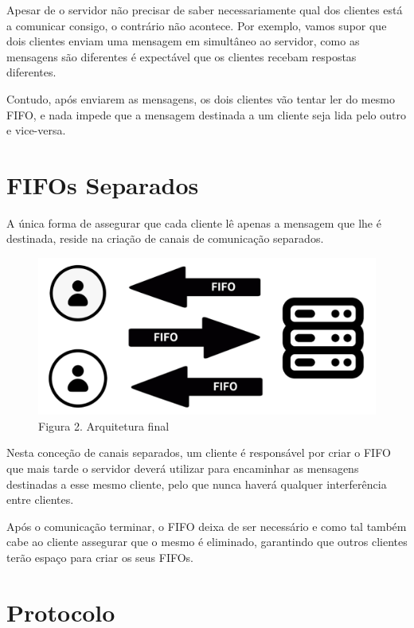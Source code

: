 \documentclass[12pt,a4paper]{report}
\begin{document}
        Apesar de o servidor não precisar de saber necessariamente qual dos clientes está a comunicar consigo, o contrário não acontece. Por exemplo, vamos supor que dois clientes enviam uma mensagem em simultâneo ao servidor, como as mensagens são diferentes é expectável que os clientes recebam respostas diferentes.

        Contudo, após enviarem as mensagens, os dois clientes vão tentar ler do mesmo FIFO, e nada impede que a mensagem destinada a um cliente seja lida pelo outro e vice-versa. 


    \section{FIFOs Separados}

        A única forma de assegurar que cada cliente lê apenas a mensagem que lhe é destinada, reside na criação de canais de comunicação separados.

        \newpage

        \begin{figure}[hb!]
            \centering
            \includegraphics{images/arq2.png}
            \caption*{Figura 2. Arquitetura final}
            \label{fig:Arq2}
        \end{figure}

        Nesta conceção de canais separados, um cliente é responsável por criar o FIFO que mais tarde o servidor deverá utilizar para encaminhar as mensagens destinadas a esse mesmo cliente, pelo que nunca haverá qualquer interferência entre clientes.

        Após o comunicação terminar, o FIFO deixa de ser necessário e como tal também cabe ao cliente assegurar que o mesmo é eliminado, garantindo que outros clientes terão espaço para criar os seus FIFOs.


    \section{Protocolo}
\end{document}
